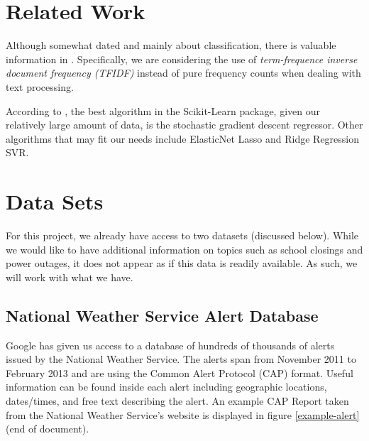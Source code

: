 \documentclass{article}
\begin{document}
\section{Related Work}
\label{related}
Although somewhat dated and mainly about classification, there is valuable information in \cite{JoachimsNLP}. Specifically, we are considering the use of \textit{term-frequence inverse document frequency (TFIDF)} instead of pure frequency counts when dealing with text processing.

According to \cite{sklearn-flow}, the best algorithm in the Scikit-Learn package, given our relatively large amount of data, is the stochastic gradient descent regressor. Other algorithms that may fit our needs include ElasticNet Lasso and Ridge Regression SVR.

\section{Data Sets}
\label{datasets}

For this project, we already have access to two datasets (discussed below). While we would like to have additional information on topics such as school closings and power outages, it does not appear as if this data is readily available. As such, we will work with what we have.

\subsection{National Weather Service Alert Database}
Google has given us access to a database of hundreds of thousands of alerts issued by the National Weather Service. The alerts span from November 2011 to February 2013 and are using the Common Alert Protocol (CAP) format. Useful information can be found inside each alert including geographic locations, dates/times, and free text describing the alert. An example CAP Report taken from the National Weather Service's website is displayed in figure \ref{example-alert} (end of document).
\end{document}
